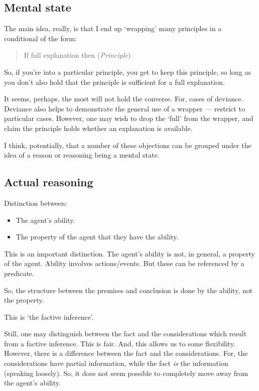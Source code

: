 \documentclass[10pt]{article}
\begin{document}
\subsection{Mental state}
\label{sec:mental-state}

{
  \color{red}
  The main idea, really, is that I end up `wrapping' many principles in a conditional of the form:
  \begin{quote}
    If full explanation then (\emph{Principle})
  \end{quote}
  So, if you're into a particular principle, you get to keep this principle, so long as you don't also hold that the principle is sufficient for a full explanation.

  It seems, perhaps, the most will not hold the converse.
  For, cases of deviance.
  Deviance also helps to demonstrate the general use of a wrapper --- restrict to particular cases.
  However, one may wish to drop the `full' from the wrapper, and claim the principle holds whether an explanation is available.
}

I think, potentially, that a number of these objections can be grouped under the idea of a reason or reasoning being a mental state.

\subsection{Actual reasoning}
\label{sec:actual-reasoning}

\begin{note}[Ability]
  Distinction between:
  \begin{itemize}
  \item The agent's ability.
  \item The property of the agent that they have the ability.
  \end{itemize}
  This is an important distinction.
  The agent's ability is not, in general, a property of the agent.
  Ability involves actions/events.
  But these can be referenced by a predicate.

  So, the structure between the premises and conclusion is done by the ability, not the property.

  This is `the factive inference'.

  Still, one may distinguish between the fact and the considerations which result from a factive inference.
  This is fair.
  And, this allows us to some flexibility.
  However, there is a difference between the fact and the considerations.
  For, the considerations have partial information, while the fact \emph{is} the information (speaking loosely).
  So, it does not seem possible to completely move away from the agent's ability.
\end{note}
\end{document}
